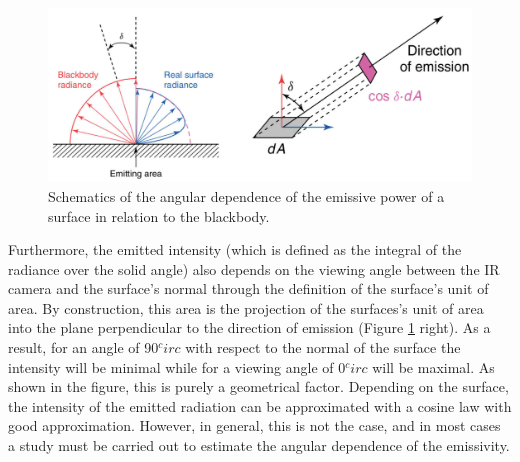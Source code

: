 		\begin{figure}[ht!]
			\centering
			\captionsetup{justification=centering,margin=2cm}
			\includegraphics[scale=0.35]{Figures/Chapter01/AngularDistributionSchematics.jpg}
			\caption{Schematics of the angular dependence of the emissive power of a surface in relation to the blackbody.}\label{fig1.7}
		\end{figure}
		
		Furthermore, the emitted intensity (which is defined as the integral of the radiance over the solid angle) also depends on the viewing angle between the IR camera and the surface's normal through the definition of the surface's unit of area. By construction, this area is the projection of the surfaces's unit of area into the plane perpendicular to the direction of emission (Figure \ref{fig1.7} right). As a result, for an angle of 90$^circ$ with respect to the normal of the surface the intensity will be minimal while for a viewing angle of 0$^circ$ will be maximal. As shown in the figure, this is purely a geometrical factor.
		Depending on the surface, the intensity of the emitted radiation can be approximated with a cosine law with good approximation. However, in general, this is not the case, and in most cases a study must be carried out to estimate the angular dependence of the emissivity.
		